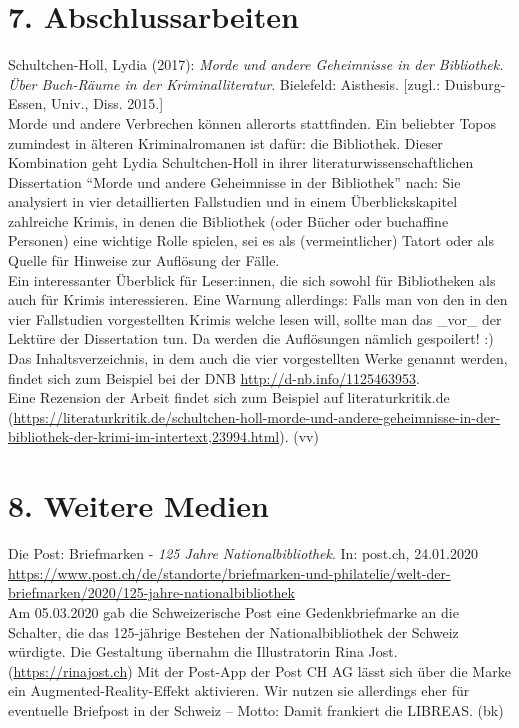 \documentclass[a4paper,
fontsize=11pt,
oneside,
numbers=noperiodatend,
parskip=half-,
bibliography=totoc,
final
]{scrartcl}
\begin{document}
\hypertarget{abschlussarbeiten}{%
\section{7. Abschlussarbeiten}\label{abschlussarbeiten}}

Schultchen-Holl, Lydia (2017): \emph{Morde und andere Geheimnisse in der
Bibliothek. Über Buch-Räume in der Kriminalliteratur}. Bielefeld:
Aisthesis. {[}zugl.: Duisburg-Essen, Univ., Diss. 2015.{]}\\
Morde und andere Verbrechen können allerorts stattfinden. Ein beliebter
Topos zumindest in älteren Kriminalromanen ist dafür: die Bibliothek.
Dieser Kombination geht Lydia Schultchen-Holl in ihrer
literaturwissenschaftlichen Dissertation ``Morde und andere Geheimnisse
in der Bibliothek'' nach: Sie analysiert in vier detaillierten
Fallstudien und in einem Überblickskapitel zahlreiche Krimis, in denen
die Bibliothek (oder Bücher oder buchaffine Personen) eine wichtige
Rolle spielen, sei es als (vermeintlicher) Tatort oder als Quelle für
Hinweise zur Auflösung der Fälle.\\
Ein interessanter Überblick für Leser:innen, die sich sowohl für
Bibliotheken als auch für Krimis interessieren. Eine Warnung allerdings:
Falls man von den in den vier Fallstudien vorgestellten Krimis welche
lesen will, sollte man das \_vor\_ der Lektüre der Dissertation tun. Da
werden die Auflösungen nämlich gespoilert! :)\\
Das Inhaltsverzeichnis, in dem auch die vier vorgestellten Werke genannt
werden, findet sich zum Beispiel bei der DNB
\url{http://d-nb.info/1125463953}.\\
Eine Rezension der Arbeit findet sich zum Beispiel auf
literaturkritik.de
(\url{https://literaturkritik.de/schultchen-holl-morde-und-andere-geheimnisse-in-der-bibliothek-der-krimi-im-intertext,23994.html}).
(vv)

\hypertarget{weitere-medien}{%
\section{8. Weitere Medien}\label{weitere-medien}}

Die Post: Briefmarken - \emph{125 Jahre Nationalbibliothek}. In:
post.ch, 24.01.2020
\url{https://www.post.ch/de/standorte/briefmarken-und-philatelie/welt-der-briefmarken/2020/125-jahre-nationalbibliothek}\\
Am 05.03.2020 gab die Schweizerische Post eine Gedenkbriefmarke an die
Schalter, die das 125-jährige Bestehen der Nationalbibliothek der
Schweiz würdigte. Die Gestaltung übernahm die Illustratorin Rina Jost.
(\url{https://rinajost.ch}) Mit der Post-App der Post CH AG lässt sich
über die Marke ein Augmented-Reality-Effekt aktivieren. Wir nutzen sie
allerdings eher für eventuelle Briefpost in der Schweiz -- Motto: Damit
frankiert die LIBREAS. (bk)
\end{document}
